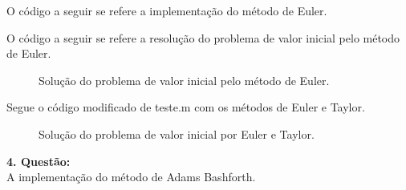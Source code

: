 \documentclass[a4paper,12pt]{article}
\begin{document}
O c\'odigo a seguir se refere a implementa\c c\~ao do m\'etodo de Euler.

\newpage
O c\'odigo a seguir se refere a resolu\c c\~ao do problema de valor inicial pelo m\'etodo de Euler.

	\begin{figure}[!h]
		\centering
		\label{fig2} 
		\caption{Solu\c c\~ao do problema de valor inicial pelo m\'etodo de Euler.}
	\end{figure}
\newpage
Segue o c\'odigo modificado de teste.m com os m\'etodos de Euler e Taylor.

	\begin{figure}[!h]
		\centering
		\label{fig3} 
		\caption{Solu\c c\~ao do problema de valor inicial por Euler e Taylor.}
	\end{figure}
\textbf{4. Quest\~ao:}\\
A implementa\c c\~ao do m\'etodo de Adams Bashforth.

\end{document}
